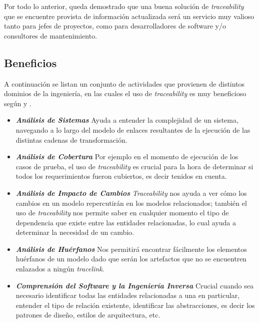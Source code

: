 \documentclass[a4paper,12pt,oneside,spanish]{book}
\begin{document}
Por todo lo anterior, queda demostrado que una buena solución de \textit{traceability} que se encuentre provista de información actualizada será un servicio muy valioso tanto para jefes de proyectos, como para desarrolladores de software y/o consultores de mantenimiento.




\subsection{Beneficios}

A continuación se listan un conjunto de actividades que provienen de distintos dominios de la ingeniería, en las cuales el uso de \textit{traceability} es muy beneficioso según \cite{BrcinaRiebisch} y \cite{GrammelVoigt}.

\begin{itemize}

\item \textit{\textbf{Análisis de Sistemas}} Ayuda a entender la complejidad de un sistema, navegando a lo largo del modelo de enlaces resultantes de la ejecución de las distintas cadenas de transformación.

\item \textit{\textbf{Análisis de Cobertura}} Por ejemplo en el momento de ejecución de los casos de prueba, el uso de \textit{traceability} es crucial para la hora de determinar si todos los requerimientos fueron cubiertos, es decir tenidos en cuenta.

\item \textit{\textbf{Análisis de Impacto de Cambios}} \textit{Traceability} nos ayuda a ver cómo los cambios en un modelo repercutirán en los modelos relacionados; también el uso de \textit{traceability} nos permite saber en cualquier momento el tipo de dependencia que existe entre las entidades relacionadas, lo cual ayuda a determinar la necesidad de un cambio.

\item \textit{\textbf{Análisis de Huérfanos}} Nos permitirá encontrar fácilmente los elementos huérfanos de un modelo dado que serán los artefactos que no se encuentren enlazados a ningún \textit{tracelink}.

\item \textit{\textbf{Comprensión del Software y la Ingeniería Inversa}} Crucial cuando sea necesario identificar todas las entidades relacionadas a una en particular, entender el tipo de relación existente, identificar las abstracciones, es decir los patrones de diseño, estilos de arquitectura, etc.


\end{itemize}
\end{document}
